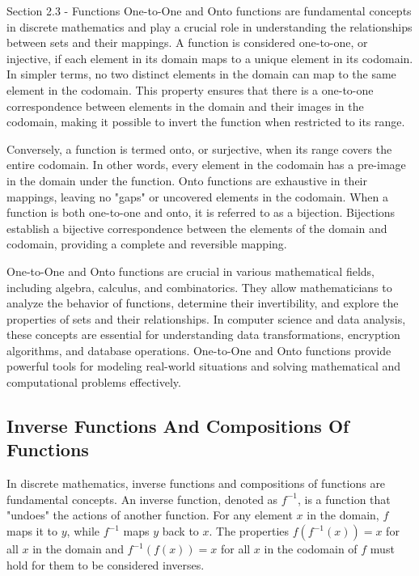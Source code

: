 \begin{notes}{Section 2.3 - Functions}
    One-to-One and Onto functions are fundamental concepts in discrete mathematics and play a crucial role in understanding the relationships between sets and their mappings. A function is considered one-to-one, 
    or injective, if each element in its domain maps to a unique element in its codomain. In simpler terms, no two distinct elements in the domain can map to the same element in the codomain. This property 
    ensures that there is a one-to-one correspondence between elements in the domain and their images in the codomain, making it possible to invert the function when restricted to its range.

    Conversely, a function is termed onto, or surjective, when its range covers the entire codomain. In other words, every element in the codomain has a pre-image in the domain under the function. Onto functions 
    are exhaustive in their mappings, leaving no "gaps" or uncovered elements in the codomain. When a function is both one-to-one and onto, it is referred to as a bijection. Bijections establish a bijective 
    correspondence between the elements of the domain and codomain, providing a complete and reversible mapping.

    One-to-One and Onto functions are crucial in various mathematical fields, including algebra, calculus, and combinatorics. They allow mathematicians to analyze the behavior of functions, determine their 
    invertibility, and explore the properties of sets and their relationships. In computer science and data analysis, these concepts are essential for understanding data transformations, encryption algorithms, 
    and database operations. One-to-One and Onto functions provide powerful tools for modeling real-world situations and solving mathematical and computational problems effectively.

    \subsection*{Inverse Functions And Compositions Of Functions}

    In discrete mathematics, inverse functions and compositions of functions are fundamental concepts. An inverse function, denoted as $f^{-1}$, is a function that "undoes" the actions of another function. For 
    any element $x$ in the domain, $f$ maps it to $y$, while $f^{-1}$ maps $y$ back to $x$. The properties $f(f^{-1}(x)) = x$ for all $x$ in the domain and $f^{-1}(f(x)) = x$ for all $x$ in the codomain of $f$ 
    must hold for them to be considered inverses.


\end{notes}
